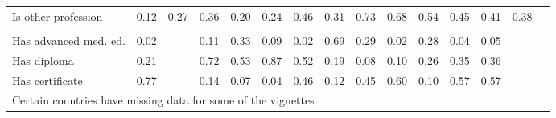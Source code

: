\begin{tabular}{l*{14}{c}}
Is other profession&           {0.12}&        {0.27}&  {0.36}&  {0.20}&    {0.24}&        {0.46}&        {0.31}&        {0.73}&        {0.68}&        {0.54}&       {0.45}&       {0.41}&       {0.38}\\
&   {}\\
Has advanced med. ed.&         {0.02}&        {}&  {0.11}&  {0.33}&    {0.09}&        {0.02}&        {0.69}&        {0.29}&        {0.02}&        {0.28}&       {0.04}&       {0.05}&       {}\\
Has diploma&                           {0.21}&        {}&  {0.72}&  {0.53}&    {0.87}&        {0.52}&        {0.19}&        {0.08}&        {0.10}&        {0.26}&       {0.35}&       {0.36}&       {}\\
Has certificate&                       {0.77}&        {}&  {0.14}&  {0.07}&    {0.04}&        {0.46}&        {0.12}&        {0.45}&        {0.60}&        {0.10}&       {0.57}&       {0.57}&       {}\\
\hline
\multicolumn{15}{l}{\footnotesize Certain countries have missing data for some of the vignettes}\\
\end{tabular}